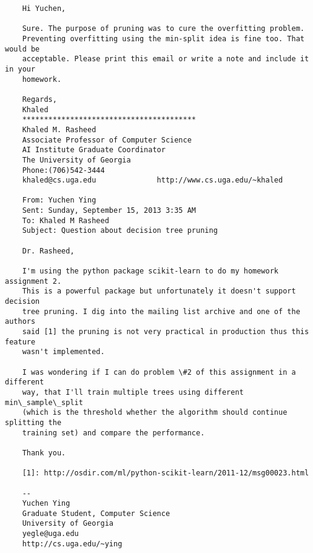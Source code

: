 \documentclass{article}
\begin{document}
\clearpage
\begin{verbatim}
    Hi Yuchen,

    Sure. The purpose of pruning was to cure the overfitting problem.
    Preventing overfitting using the min-split idea is fine too. That would be
    acceptable. Please print this email or write a note and include it in your
    homework.

    Regards,
    Khaled
    ****************************************
    Khaled M. Rasheed
    Associate Professor of Computer Science
    AI Institute Graduate Coordinator
    The University of Georgia
    Phone:(706)542-3444
    khaled@cs.uga.edu              http://www.cs.uga.edu/~khaled

    From: Yuchen Ying
    Sent: Sunday, September 15, 2013 3:35 AM
    To: Khaled M Rasheed
    Subject: Question about decision tree pruning

    Dr. Rasheed,

    I'm using the python package scikit-learn to do my homework assignment 2.
    This is a powerful package but unfortunately it doesn't support decision
    tree pruning. I dig into the mailing list archive and one of the authors
    said [1] the pruning is not very practical in production thus this feature
    wasn't implemented.

    I was wondering if I can do problem \#2 of this assignment in a different
    way, that I'll train multiple trees using different min\_sample\_split
    (which is the threshold whether the algorithm should continue splitting the
    training set) and compare the performance.

    Thank you.

    [1]: http://osdir.com/ml/python-scikit-learn/2011-12/msg00023.html 

    --
    Yuchen Ying
    Graduate Student, Computer Science
    University of Georgia
    yegle@uga.edu
    http://cs.uga.edu/~ying
\end{verbatim}
\end{document}
